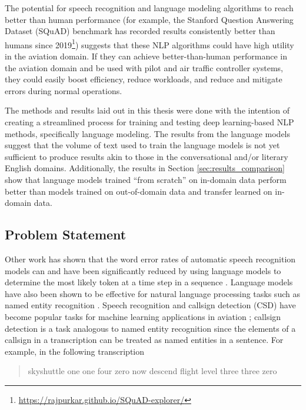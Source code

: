 \documentclass[12pt]{article}
\begin{document}
The potential for speech recognition and language modeling algorithms to reach better than human performance (for example, the Stanford Question
Answering Dataset (SQuAD) benchmark has recorded results consistently better than humans since
2019\footnote{\url{https://rajpurkar.github.io/SQuAD-explorer/}}) \cite{zhang_ai_2022} suggests that these NLP algorithms could have high utility in the
aviation domain. If they can achieve better-than-human performance in the aviation domain and be used with pilot and air traffic controller systems,
they could easily boost efficiency, reduce workloads, and reduce and mitigate errors during normal operations.

The methods and results laid out in this thesis were done with the intention of creating a streamlined process for training and testing deep
learning-based NLP methods, specifically language modeling. The results from the language models suggest that the volume of text used to train the
language models is not yet sufficient to produce results akin to those in the conversational and/or literary English domains. Additionally, the
results in Section \ref{sec:results_comparison} show that language models trained ``from scratch'' on in-domain data perform better than models
trained on out-of-domain data and transfer learned on in-domain data.

\subsection{Problem Statement}\label{sec:problem_statement}
Other work has shown that the word error rates of automatic speech recognition models can and have been significantly reduced by using language models
to determine the most likely token at a time step in a sequence \cite{li_jasper_2019,kriman_quartznet_2020}. Language models have also been shown to
be effective for natural language processing tasks such as named entity recognition \cite{devlin_bert_2019,liu_roberta_2019}. Speech recognition and
callsign detection (CSD) have become popular tasks for machine learning applications in aviation
\cite{pellegrini_airbus_2019,delpech_real-life_2018,helmke_quantifying_2017}; callsign detection is a task analogous to named entity recognition since
the elements of a callsign in a transcription can be treated as named entities in a sentence. For example, in the following transcription

\begin{quote}
    skyshuttle one one four zero now descend flight level three three zero
\end{quote}
\end{document}
